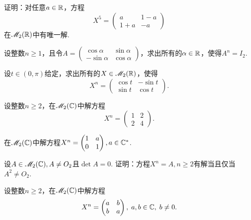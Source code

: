 \begin{problem}

  证明：对任意$a\in\mathbb R$，方程
  \[
    X^5 = \begin{pmatrix}
      a & 1 - a \\
      1 + a & -a
    \end{pmatrix}
  \]
  在$\mathscr M_2(\mathbb R)$中有唯一解.
\end{problem}

\begin{problem}
  设整数$n\ge1$，且令$A=\begin{pmatrix}
    \cos \alpha & \sin \alpha \\
    -\sin \alpha & \cos \alpha
  \end{pmatrix}$，求出所有的$\alpha\in\mathbb R$，使得$A^n=I_2$.
\end{problem}

\begin{problem}

  设$t\in(0,\pi)$给定，求出所有的$X\in\mathscr M_2(\mathbb R)$，使得
  \[
    X^n = \begin{pmatrix}
      \cos t & - \sin t \\
      \sin t & \cos t
    \end{pmatrix}.
  \]
\end{problem}

\begin{problem}
  设整数$n\ge2$，在$\mathscr M_2(\mathbb C)$中解方程
  \[
    X^n = \begin{pmatrix}
      1 & 2 \\
      2 & 4
    \end{pmatrix}.
  \]
\end{problem}

\begin{problem}
  在$\mathscr M_2(\mathbb C)$中解方程$X^n=\begin{pmatrix}
    1 & a \\
    0 & 1
  \end{pmatrix},a\in\mathbb C^\ast$.
\end{problem}

\begin{problem}
  设$A\in\mathscr M_2(\mathbb C),A\ne O_2$且$\det A=0$. 证明：方程$X^n=A,n\ge2$有解当且仅当$A^2\ne O_2$.
\end{problem}

\begin{problem}
  设整数$n\ge2$，在$\mathscr M_2(\mathbb C)$中解方程
  \[
    X^n = \begin{pmatrix}
      a & b \\
      b & a
    \end{pmatrix},\;a,b\in\mathbb C,\;b\ne0.
  \]
\end{problem}

